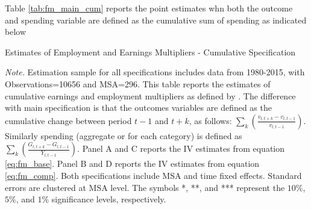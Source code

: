 \documentclass[dv_diss_main.tex]{subfiles}
\begin{document}
\newpage
Table \ref{tab:fm_main_cum} reports the point estimates whn both the outcome and spending variable are defined as the cumulative sum of spending as indicated below 
\begin{table}[H]
    \begin{center}
    
    \caption{Estimates of Employment and Earnings Multipliers - Cumulative Specification}\label{tab:fm_main_cum}

	\resizebox*{0.95\textwidth}{!}	{
    
    }
    \end{center}
    \footnotesize {
    \textit{Note. } Estimation sample for all specifications includes data from 1980-2015, with Observations=10656 and MSA=296. This table reports the estimates of cumulative earnings and employment multipliers as defined by \cite{ramey2018government}. The difference with main specification is that the outcomes variables are defined as the cumulative change between period $t-1$ and $t+k$, as follows: $\sum_{k}(\frac{v_{l,t+k}-v_{l,t-1}}{v_{l,t-1}})$. Similarly spending (aggregate or for each category) is defined as $\sum_{k}(\frac{G_{l,t+k}-G_{l,t-1}}{Y_{l,t-1}})$. Panel A and C reports the IV estimates from equation \eqref{eq:fm_base}. Panel B and D reports the IV estimates from equation \eqref{eq:fm_comp}. Both specifications include MSA and time fixed effects.  Standard errors are clustered at MSA level. The symbols *, **, and *** represent the $10\%$, $5\%$, and $1\%$ significance levels, respectively.}

\end{table}
\newpage

\end{document}
